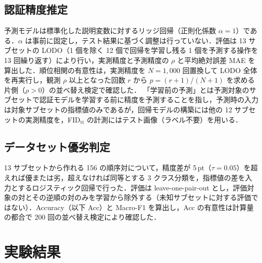\documentclass[technicalreport]{ieicej}
\begin{document}
\subsection{認証精度推定}
予測モデルは標準化した説明変数に対するリッジ回帰（正則化係数 $\alpha=1$）である．$\alpha$ は事前に固定し，テスト結果に基づく調整は行っていない．評価は 13 サブセットの LODO（1 個を除く 12 個で回帰を学習し残る 1 個を予測する操作を 13 回繰り返す）により行い，実測精度と予測精度の $\rho$ と平均絶対誤差 MAE を算出した．順位相関の有意性は，実測精度を $N=1{,}000$ 回置換して LODO 全体を再実行し，観測 $\rho$ 以上となった回数 $r$ から $p=(r+1)/(N+1)$ を求める片側（$\rho>0$）の並べ替え検定で確認した．
「学習前の予測」とは予測対象のサブセットで認証モデルを学習する前に精度を予測することを指し，予測時の入力は対象サブセットの指標値のみであるが，回帰モデルの構築には他の 12 サブセットの実測精度を，FID$_{\mathrm{tt}}$ の計測にはテスト画像（ラベル不要）を用いる．

\subsection{データセット優劣判定}
13 サブセットから作れる 156 の順序対について，精度差が 5\,pt（$\tau=0.05$）を超えれば優または劣，超えなければ同等とする 3 クラス分類を，指標値の差を入力とするロジスティック回帰で行った．評価は leave-one-pair-out とし，評価対象の対とその逆順の対のみを学習から除外する（未知サブセットに対する評価ではない）．Accuracy（以下 Acc）と Macro-F1 を算出し，Acc の有意性は計算量の都合で 200 回の並べ替え検定により確認した．

\section{実験結果}
\end{document}
